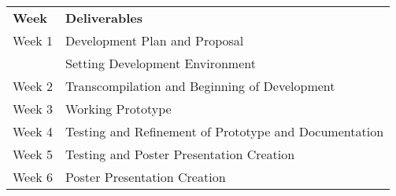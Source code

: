 \documentclass{article}
\begin{document}
\begin{center}
\begin{tabular}{ l | l }
  \textbf{Week} & \textbf{Deliverables} \\
  \hhline{=|=}
  Week 1 & Development Plan and Proposal\\
         & Setting Development Environment\\ 
  Week 2 & Transcompilation and Beginning of Development\\
  Week 3 & Working Prototype\\
  Week 4 & Testing and Refinement of Prototype and Documentation\\
  Week 5 & Testing and Poster Presentation Creation\\
  Week 6 & Poster Presentation Creation\\
\end{tabular}
\end{center}

\end{document}
